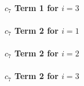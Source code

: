 \paragraph{$c_{7}$ Term 1 for $i=3$ }

\paragraph{$c_{7}$ Term 2 for $i=1$ }

\paragraph{$c_{7}$ Term 2 for $i=2$ }

\paragraph{$c_{7}$ Term 2 for $i=3$ }


